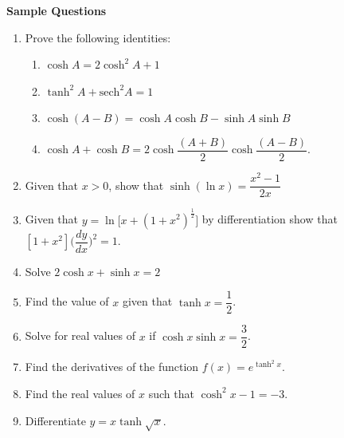 \documentclass[11pt,a4paper]{article}
\begin{document}
\pagebreak
\textbf{Sample Questions}
\begin{enumerate}
\item Prove the following identities:
\begin{enumerate}
      \item $\cosh A=2\cosh^2A+1$\\
      
      \item $\tanh^2A+\text{sech}^2A=1$\\
      
      \item $\cosh (A-B)=\cosh A \cosh B-\sinh A \sinh B$\\
      
      \item $\cosh A+\cosh B =2\cosh \dfrac{(A+B)}{2}\cosh \dfrac{(A-B)}{2}$.\\
\end{enumerate}

\item Given that $x>0$, show that $\sinh (\ln x)=\dfrac{x^2-1}{2x}$\\

\item Given that $y=\ln \bigg[x+(1+x^2)^{\displaystyle {\frac{1}{2}}}\bigg]$ by differentiation show that $[1+x^2]\bigg(\dfrac{dy}{dx}\bigg)^2=1$.\\

\item Solve $2\cosh x +\sinh x=2$\\

\item Find the value of $x$ given that $\tanh x=\dfrac{1}{2}$.\\

\item Solve for real values of $x$ if $\cosh x\sinh x=\dfrac{3}{2}$.\\

\item Find the derivatives of the function $f(x)=e^{\displaystyle {\tanh^2x}}$.\\

\item Find the real values of $x$ such that $\cosh^2x-1=-3$.\\

\item Differentiate $y=x\tanh \sqrt{x}$.\\
\end{enumerate}
\end{document}
